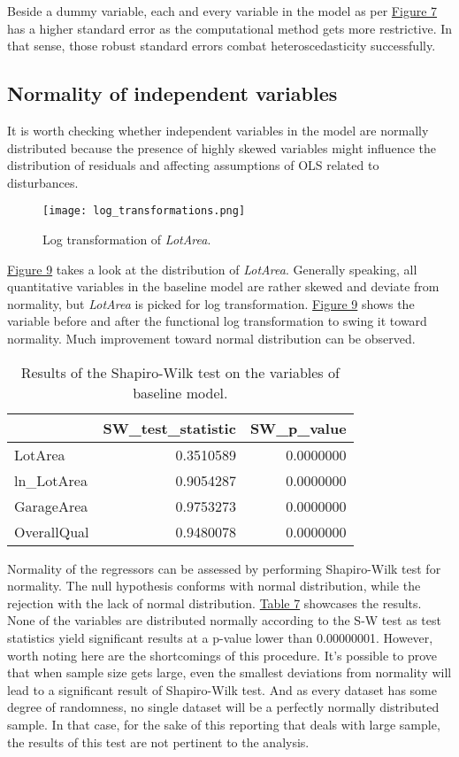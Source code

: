 \documentclass{article}
\begin{document}
Beside a dummy variable, each and every variable in the model as per \hyperref[tab:standarderrors]{Figure 7} has a higher standard error as the computational method gets more restrictive. In that sense, those robust standard errors combat heteroscedasticity successfully.

\subsection{Normality of independent variables}

It is worth checking whether independent variables in the model are normally distributed because the presence of highly skewed variables might influence the distribution of residuals and affecting assumptions of OLS related to disturbances.

\begin{figure}[h]
    \caption{Log transformation of \emph{LotArea}.}
    \centering
    \texttt{[image: log\_transformations.png]}
    \label{fig:logtransform}
\end{figure}

\hyperref[fig:logtransform]{Figure 9} takes a look at the distribution of \emph{LotArea}. Generally speaking, all quantitative variables in the baseline model are rather skewed and deviate from normality, but \emph{LotArea} is picked for log transformation. \hyperref[fig:logtransform]{Figure 9} shows the variable before and after the functional log transformation to swing it toward normality. Much improvement toward normal distribution can be observed.

\begin{table}[!htbp]
\centering
\caption{\label{tab:SWtest} Results of the Shapiro-Wilk test on the variables of baseline model.}
\begin{tabular}{l|r|r}
\hline
  & SW\_test\_statistic & SW\_p\_value\\
\hline
LotArea & 0.3510589 & 0.0000000\\
\hline
ln\_LotArea & 0.9054287 & 0.0000000\\
\hline
GarageArea & 0.9753273 & 0.0000000\\
\hline
OverallQual & 0.9480078 & 0.0000000\\
\hline
\end{tabular}
\end{table}

Normality of the regressors can be assessed by performing Shapiro-Wilk test for normality. The null hypothesis conforms with normal distribution, while the rejection with the lack of normal distribution. \hyperref[tab:SWtest]{Table 7} showcases the results. None of the variables are distributed normally according to the S-W test as test statistics yield significant results at a p-value lower than 0.00000001. However, worth noting here are the shortcomings of this procedure. It's possible to prove that when sample size gets large, even the smallest deviations from normality will lead to a significant result of Shapiro-Wilk test. And as every dataset has some degree of randomness, no single dataset will be a perfectly normally distributed sample. In that case, for the sake of this reporting that deals with large sample, the results of this test are not pertinent to the analysis.
\end{document}
